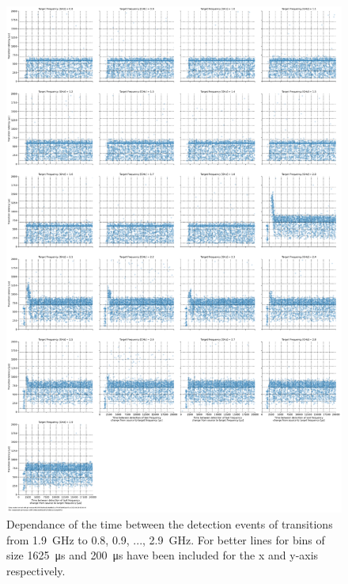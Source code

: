 \begin{figure}[]
    \centering
    \includegraphics[width=\columnwidth]{fig/ftalat/ftalat_scatter_wait_transition_latency_hati_source_1.9.pdf}
    \caption{Dependance of the time between the detection events of transitions from \SI{1.9}{\GHz} to \SI{0.8}{}, \SI{0.9}{}, ..., \SI{2.9}{\GHz}. For better lines for bins of size \SI{1625}{\us} and \SI{200}{\us} have been included for the x and y-axis respectively.}
\end{figure}
